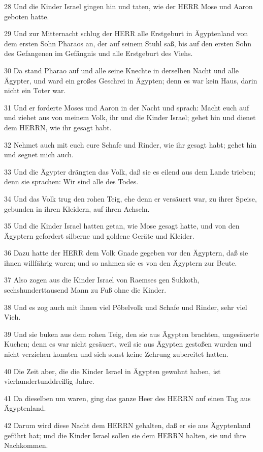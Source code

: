 \par 28 Und die Kinder Israel gingen hin und taten, wie der HERR Mose und Aaron geboten hatte.
\par 29 Und zur Mitternacht schlug der HERR alle Erstgeburt in Ägyptenland von dem ersten Sohn Pharaos an, der auf seinem Stuhl saß, bis auf den ersten Sohn des Gefangenen im Gefängnis und alle Erstgeburt des Viehs.
\par 30 Da stand Pharao auf und alle seine Knechte in derselben Nacht und alle Ägypter, und ward ein großes Geschrei in Ägypten; denn es war kein Haus, darin nicht ein Toter war.
\par 31 Und er forderte Moses und Aaron in der Nacht und sprach: Macht euch auf und ziehet aus von meinem Volk, ihr und die Kinder Israel; gehet hin und dienet dem HERRN, wie ihr gesagt habt.
\par 32 Nehmet auch mit euch eure Schafe und Rinder, wie ihr gesagt habt; gehet hin und segnet mich auch.
\par 33 Und die Ägypter drängten das Volk, daß sie es eilend aus dem Lande trieben; denn sie sprachen: Wir sind alle des Todes.
\par 34 Und das Volk trug den rohen Teig, ehe denn er versäuert war, zu ihrer Speise, gebunden in ihren Kleidern, auf ihren Achseln.
\par 35 Und die Kinder Israel hatten getan, wie Mose gesagt hatte, und von den Ägyptern gefordert silberne und goldene Geräte und Kleider.
\par 36 Dazu hatte der HERR dem Volk Gnade gegeben vor den Ägyptern, daß sie ihnen willfährig waren; und so nahmen sie es von den Ägyptern zur Beute.
\par 37 Also zogen aus die Kinder Israel von Raemses gen Sukkoth, sechshunderttausend Mann zu Fuß ohne die Kinder.
\par 38 Und es zog auch mit ihnen viel Pöbelvolk und Schafe und Rinder, sehr viel Vieh.
\par 39 Und sie buken aus dem rohen Teig, den sie aus Ägypten brachten, ungesäuerte Kuchen; denn es war nicht gesäuert, weil sie aus Ägypten gestoßen wurden und nicht verziehen konnten und sich sonst keine Zehrung zubereitet hatten.
\par 40 Die Zeit aber, die die Kinder Israel in Ägypten gewohnt haben, ist vierhundertunddreißig Jahre.
\par 41 Da dieselben um waren, ging das ganze Heer des HERRN auf einen Tag aus Ägyptenland.
\par 42 Darum wird diese Nacht dem HERRN gehalten, daß er sie aus Ägyptenland geführt hat; und die Kinder Israel sollen sie dem HERRN halten, sie und ihre Nachkommen.
